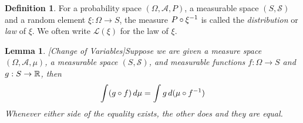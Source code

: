 \documentclass{amsart}
\newtheorem{lem}[thm]{Lemma}
\theoremstyle{remark}
\theoremstyle{definition}
\newtheorem{defn}[thm]{Definition}
\begin{document}
\begin{defn}For a probability space $(\Omega, \mathcal{A}, P)$, a
  measurable space $(S, \mathcal{S})$ and a
  random element $\xi : \Omega \to S$, the measure $P \circ \xi^{-1}$ is
  called the \emph{distribution} or \emph{law} of $\xi$.  We often
  write $\mathcal{L}(\xi)$ for the law of $\xi$.
\end{defn}
\begin{lem}\label{ChangeOfVariables}[Change of Variables]Suppose we are given a measure space $(\Omega, \mathcal{A},
  \mu)$, a measurable space $(S, \mathcal{S})$, and measurable
  functions $f : \Omega \to S$ and $g : S \to \mathbb{R}$, then 
\begin{align*}
\int (g \circ f) \, d \mu = \int g \, d (\mu \circ f^{-1})
\end{align*}
Whenever either side of the equality exists, the other does and they
are equal.
\end{lem}
\end{document}
